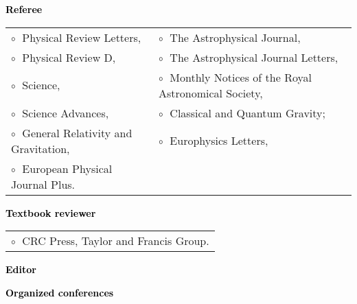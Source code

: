\documentclass[a4paper]{moderncv}
\begin{document}
\textbf{\textcolor{black}{Referee}}\vspace{0.1cm}\\
\begin{tabular}{@{\hskip 0.4cm}l@{\hskip 0.4in}l}
$\circ\;$ Physical Review Letters, & $\circ\;$ The Astrophysical Journal,   \\
$\circ\;$ Physical Review D, & $\circ\;$ The Astrophysical Journal  Letters,  \\
$\circ\;$ Science,  & $\circ\;$ Monthly Notices of the Royal Astronomical Society, \\
$\circ\;$ Science Advances, & $\circ\;$  Classical and Quantum Gravity; \\
$\circ\;$ General Relativity and Gravitation, &  $\circ\;$ Europhysics Letters,\\
$\circ\;$ European Physical Journal Plus.\\
\end{tabular}
\vspace{0.2cm}
 

 \textbf{\textcolor{black}{Textbook reviewer}}\vspace{0.1cm}\\
\begin{tabular}{@{\hskip 0.4cm}l}
$\circ\;$ CRC Press, Taylor and Francis Group.
\end{tabular}
\vspace{0.2cm}


 \textbf{\textcolor{black}{Editor}}\vspace{0.1cm}\\
 \vspace{-0.1cm}
\vspace{0.2cm}



\textbf{\textcolor{black}{Organized conferences}}\vspace{0.05cm}\\
 \vspace{-0.1cm}
\end{document}
